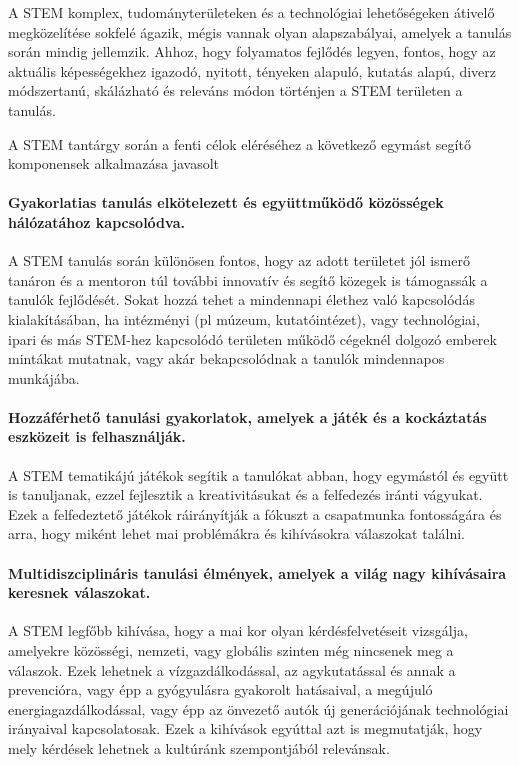 A STEM komplex, tudományterületeken és a technológiai lehetőségeken átivelő megközelítése sokfelé ágazik, mégis vannak olyan alapszabályai, amelyek a tanulás során mindig jellemzik. Ahhoz, hogy folyamatos fejlődés legyen, fontos, hogy az aktuális képességekhez igazodó, nyitott, tényeken alapuló, kutatás alapú, diverz módszertanú, skálázható és releváns módon történjen a STEM területen a tanulás.

A STEM tantárgy során a fenti célok eléréséhez a következő egymást segítő komponensek alkalmazása javasolt


\paragraph{Gyakorlatias tanulás elkötelezett és együttműködő közösségek hálózatához kapcsolódva.}
A STEM tanulás során különösen fontos, hogy az adott területet jól ismerő tanáron és a mentoron túl további innovatív és segítő közegek is támogassák a tanulók fejlődését. Sokat hozzá tehet a mindennapi élethez való kapcsolódás kialakításában, ha intézményi (pl múzeum, kutatóintézet), vagy technológiai, ipari és más STEM-hez kapcsolódó területen működő cégeknél dolgozó emberek mintákat mutatnak, vagy akár bekapcsolódnak a tanulók mindennapos munkájába.

\paragraph{Hozzáférhető tanulási gyakorlatok, amelyek a játék és a kockáztatás eszközeit is felhasználják.} A STEM tematikájú játékok segítik a tanulókat abban, hogy egymástól és együtt is tanuljanak, ezzel fejlesztik a kreativitásukat és a felfedezés iránti vágyukat. Ezek a felfedeztető játékok ráirányítják a fókuszt a csapatmunka fontosságára és arra, hogy miként lehet mai problémákra és kihívásokra válaszokat találni.

\paragraph{Multidiszciplináris tanulási élmények, amelyek a világ nagy kihívásaira keresnek válaszokat.} A STEM legfőbb kihívása, hogy a mai kor olyan kérdésfelvetéseit vizsgálja, amelyekre közösségi, nemzeti, vagy globális szinten még nincsenek meg a válaszok. Ezek lehetnek a vízgazdálkodással, az agykutatással és annak a prevencióra, vagy épp a gyógyulásra gyakorolt hatásaival, a megújuló energiagazdálkodással, vagy épp az önvezető autók új generációjának technológiai irányaival kapcsolatosak. Ezek a kihívások egyúttal azt is megmutatják, hogy mely kérdések lehetnek a kultúránk szempontjából relevánsak.

